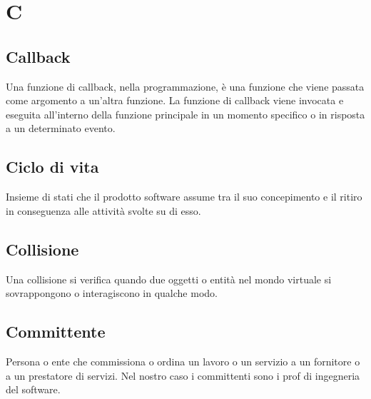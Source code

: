 \section{C}
\subsection{Callback}
Una funzione di callback, nella programmazione, è una funzione che viene passata come argomento a un'altra funzione. La funzione di callback viene invocata e eseguita all'interno della funzione principale in un momento specifico o in risposta a un determinato evento.

\subsection{Ciclo di vita}%
Insieme di stati che il prodotto software assume tra il suo concepimento e il ritiro in 
conseguenza alle attività svolte su di esso.

\subsection{Collisione}
Una collisione si verifica quando due oggetti o entità nel mondo virtuale si sovrappongono o interagiscono in qualche modo.

\subsection{Committente}%
Persona o ente che commissiona o ordina un lavoro o un servizio a un fornitore o a un 
prestatore di servizi.
Nel nostro caso i committenti sono i prof di ingegneria del software.

\clearpage